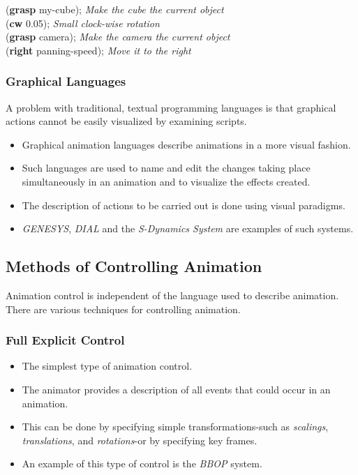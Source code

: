 \begin{algorithm*}[H]
	(\textbf{grasp} my-cube); \textit{Make the cube the current object} \\
	
	(\textbf{cw} 0.05); \textit{Small clock-wise rotation} \\
	
	(\textbf{grasp} camera); \textit{Make the camera the current object} \\
	
	(\textbf{right} panning-speed); \textit{Move it to the right}
\end{algorithm*}



\subsubsection{Graphical Languages} 
A problem with traditional, textual programming languages is that graphical actions cannot be easily visualized by examining scripts.
\begin{itemize}
	\item Graphical animation languages describe animations in a more visual fashion. 
	\item Such languages are used to name and edit the changes taking place simultaneously in an animation and to visualize the effects created. 
	\item The description of actions to be carried out is done using visual paradigms. 
	\item \textit{GENESYS}, \textit{DIAL} and the \textit{S-Dynamics System} are examples of such systems.
\end{itemize}

\subsection{Methods of Controlling Animation}
Animation control is independent of the language used to describe animation. There are various techniques for controlling animation.

\subsubsection{Full Explicit Control}
\begin{itemize}
	\item The simplest type of animation control. 
	\item The animator provides a description of all events that could occur in an animation. 
	\item This can be done by specifying simple transformations-such as \textit{scalings}, \textit{translations}, and \textit{rotations}-or by specifying key frames.
	\item An example of this type of control is the \textit{BBOP} system.
	\end{itemize}


